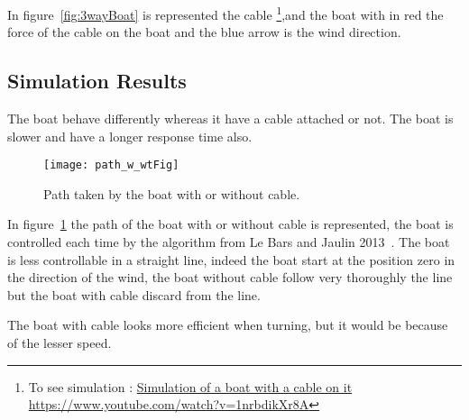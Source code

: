 In figure~\ref{fig:3wayBoat} is represented the cable \footnote{To see simulation : \href{https://www.youtube.com/watch?v=1nrbdikXr8A}{Simulation of a boat with a cable on it https://www.youtube.com/watch?v=1nrbdikXr8A}},and the boat with in red the force of the cable on the boat and the blue arrow is the wind direction.

\subsection{Simulation Results}

The boat behave differently whereas it have a cable attached or not. The boat is slower and have a longer response time also.

\begin{figure}[H]
\centering
    \texttt{[image: path\_w\_wtFig]}
    \caption{Path taken by the boat with or without cable.}
    \label{fig:pathBoat}
\end{figure}

In figure~\ref{fig:pathBoat} the path of the boat with or without cable is represented, the boat is controlled each time by the algorithm from Le Bars and Jaulin 2013~\cite{LeBars2013}. The boat is less controllable in a straight
line, indeed the boat start at the position zero in the direction of the wind, the boat without cable follow very thoroughly the line but the boat with cable discard from the line.

The boat with cable looks more efficient when turning, but it would be because of the lesser speed.

